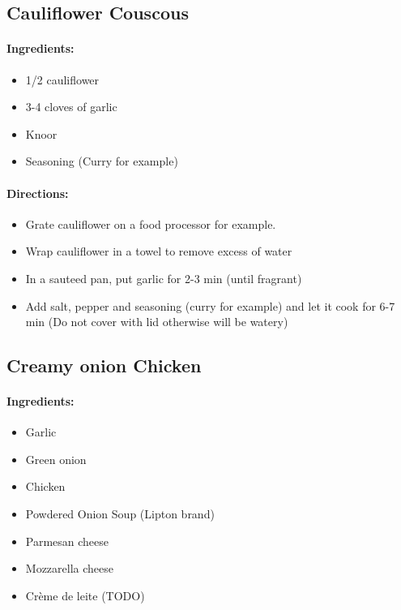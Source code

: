 \documentclass{article}
\begin{document}
\subsection{Cauliflower Couscous}

\paragraph{Ingredients:}
\begin{itemize}
    \item 1/2 cauliflower
    \item 3-4 cloves of garlic
    \item Knoor
    \item Seasoning (Curry for example)
\end{itemize}

\paragraph{Directions:}
\begin{itemize}
    \item Grate cauliflower on a food processor for example.
    \item Wrap cauliflower in a towel to remove excess of water
    \item In a sauteed pan, put garlic for 2-3 min (until fragrant)
    \item Add salt, pepper and seasoning (curry for example) and let it cook for 6-7 min (Do not cover with lid otherwise will be watery)
\end{itemize}

\subsection{Creamy onion Chicken}

\paragraph{Ingredients:}
\begin{itemize}
    \item Garlic
    \item Green onion
    \item Chicken
    \item Powdered Onion Soup (Lipton brand)
    \item Parmesan cheese
    \item Mozzarella cheese
    \item Crème de leite (TODO)
\end{itemize}
\end{document}
